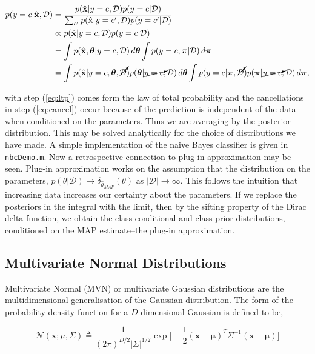 \documentclass[11pt]{amsart}
\begin{document}
\begin{align}
p(y = c|\hat{\mathbf{x}}, \mathcal{D}) &= \frac{p(\hat{\mathbf{x}}|y = c, \mathcal{D})p(y=c|\mathcal{D})}{\sum_{c'}p(\hat{\mathbf{x}}|y = c', \mathcal{D})p(y=c'|\mathcal{D})} \notag \\ &\propto p(\hat{\mathbf{x}}|y = c, \mathcal{D})p(y=c|\mathcal{D}) \notag \\
&= \int p(\hat{\mathbf{x}}, \boldsymbol\theta|y = c, \mathcal{D})\mathop{d\boldsymbol\theta}\int p(y=c, \boldsymbol\pi|\mathcal{D})\mathop{d\boldsymbol\pi} \label{eq:ltp} \\
&= \int p(\hat{\mathbf{x}}|y = c, \boldsymbol\theta, \cancelto{}{\mathcal{D}})p(\boldsymbol\theta|\cancelto{}{y = c}, \mathcal{D})\mathop{d\boldsymbol\theta}\int p(y=c|\boldsymbol\pi, \cancelto{}{\mathcal{D}})p(\boldsymbol\pi|\cancelto{}{y = c}, \mathcal{D})\mathop{d\boldsymbol\pi}, \label{eq:cancel}
\end{align}

with step (\ref{eq:ltp}) comes form the law of total probability and the cancellations in step (\ref{eq:cancel}) occur because of the prediction is independent of the data when conditioned on the parameters. Thus we are averaging by the posterior distribution. This may be solved analytically for the choice of distributions we have made. A simple implementation of the naive Bayes classifier is given in \texttt{nbcDemo.m}. Now a retrospective connection to plug-in approximation may be seen. Plug-in approximation works on the assumption that the distribution on the parameters, $p(\theta|\mathcal{D}) \to \delta_{\hat{\theta}_{MAP}}(\theta)$ as $|\mathcal{D}| \to \infty$. This follows the intuition that increasing data increases our certainty about the parameters. If we replace the posteriors in the integral with the limit, then by the sifting property of the Dirac delta function, we obtain the class conditional and class prior distributions, conditioned on the MAP estimate--the plug-in approximation.

\subsection{Multivariate Normal Distributions}
Multivariate Normal (MVN) or multivariate Gaussian distributions are the multidimensional generalisation of the Gaussian distribution. The form of the probability density function for a $D$-dimensional Gaussian is defined to be,

$$\mathcal{N}(\mathbf{x} ; \mu, \Sigma) \triangleq \frac{1}{(2\pi)^{D/2}|\Sigma|^{1/2}}
\exp\bigg[-\frac{1}{2}(\mathbf{x} - \mathbf{\mu})^T\Sigma^{-1}(\mathbf{x} - \mathbf{\mu})\bigg]
$$
\end{document}
